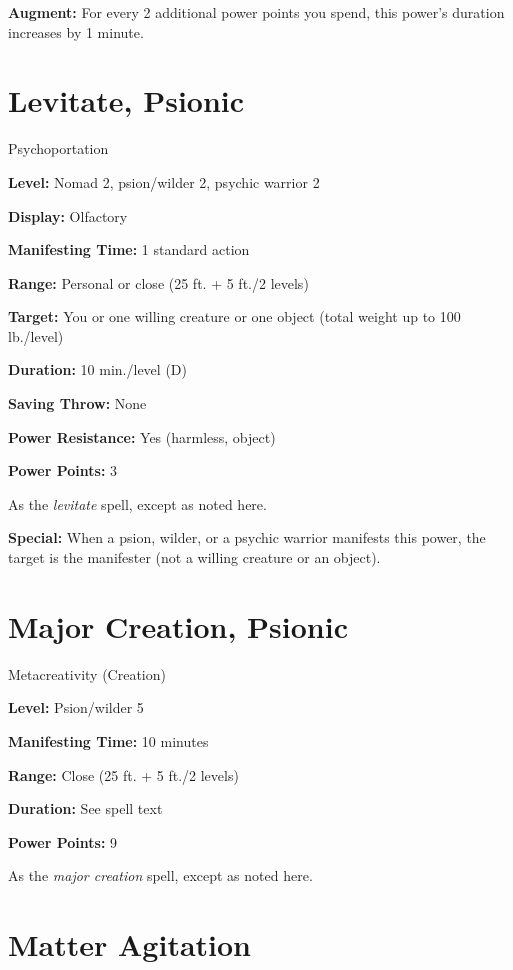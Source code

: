 \documentclass{article}
\begin{document}
\textbf{Augment:} For every 2 additional power points you spend, this power's duration 
increases by 1 minute.

\vspace{12pt}
\section*{Levitate, Psionic}

Psychoportation

\textbf{Level:} Nomad 2, psion/wilder 2, psychic warrior 2

\textbf{Display:} Olfactory

\textbf{Manifesting Time:} 1 standard action

\textbf{Range:} Personal or close (25 ft. + 5 ft./2 levels)

\textbf{Target:} You or one willing creature or one object (total weight up to 
100 lb./level)

\textbf{Duration:} 10 min./level (D)

\textbf{Saving Throw:} None

\textbf{Power Resistance:} Yes (harmless, object)

\textbf{Power Points:} 3

As the \textit{levitate }spell, except as noted here.

\textbf{Special:} When a psion, wilder, or a psychic warrior manifests this power, 
the target is the manifester (not a willing creature or an object).

\vspace{12pt}
\section*{Major Creation, Psionic}

Metacreativity (Creation)

\textbf{Level:} Psion/wilder 5

\textbf{Manifesting Time:} 10 minutes

\textbf{Range:} Close (25 ft. + 5 ft./2 levels)

\textbf{Duration:} See spell text

\textbf{Power Points:} 9

As the \textit{major creation }spell, except as noted here.

\vspace{12pt}
\section*{Matter Agitation}
\end{document}
